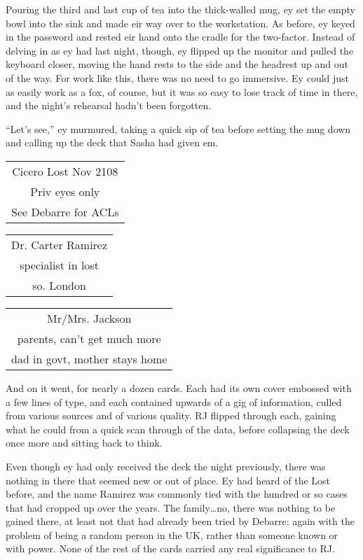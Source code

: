 Pouring the third and last cup of tea into the thick-walled mug, ey set the empty bowl into the sink and made eir way over to the workstation. As before, ey keyed in the password and rested eir hand onto the cradle for the two-factor. Instead of delving in as ey had last night, though, ey flipped up the monitor and pulled the keyboard closer, moving the hand rests to the side and the headrest up and out of the way. For work like this, there was no need to go immersive. Ey could just as easily work as a fox, of course, but it was so easy to lose track of time in there, and the night's rehearsal hadn't been forgotten.

``Let's see,'' ey murmured, taking a quick sip of tea before setting the mug down and calling up the deck that Sasha had given em.

\begin{tabular}{| c |}
  \hline
  Cicero Lost Nov 2108\\
  Priv eyes only\\
  See Debarre for ACLs\\
  \hline
\end{tabular}
\begin{tabular}{| c |}
  \hline
  Dr. Carter Ramirez\\
  specialist in lost\\
  so. London\\
  \hline
\end{tabular}
\begin{tabular}{| c |}
  \hline
  Mr/Mrs. Jackson\\
  parents, can't get much more\\
  dad in govt, mother stays home\\
  \hline
\end{tabular}

And on it went, for nearly a dozen cards. Each had its own cover embossed with a few lines of type, and each contained upwards of a gig of information, culled from various sources and of various quality. RJ flipped through each, gaining what he could from a quick scan through of the data, before collapsing the deck once more and sitting back to think.

Even though ey had only received the deck the night previously, there was nothing in there that seemed new or out of place. Ey had heard of the Lost before, and the name Ramirez was commonly tied with the hundred or so cases that had cropped up over the years. The family\ldots{}no, there was nothing to be gained there, at least not that had already been tried by Debarre; again with the problem of being a random person in the UK, rather than someone known or with power. None of the rest of the cards carried any real significance to RJ.

